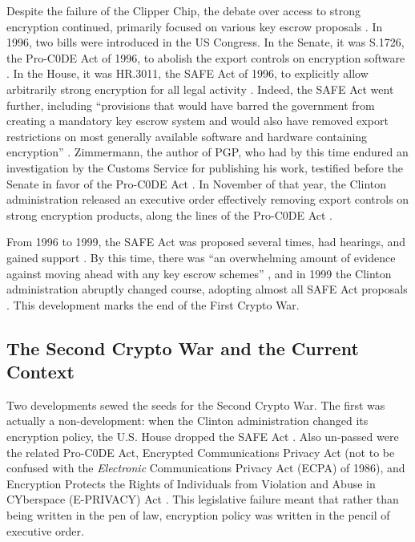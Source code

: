 Despite the failure of the Clipper Chip, the debate over access to strong encryption continued, primarily focused on
various key escrow proposals \cite{thompson_2015}. In 1996, two bills were introduced in the US Congress. In the Senate,
it was S.1726, the Pro-C0DE Act of 1996, to abolish the export controls on encryption software \cite{burns_s1726_1996}.
In the House, it was HR.3011, the SAFE Act of 1996, to explicitly allow arbitrarily strong encryption for all legal
activity \cite{goodlatte_hr3011_1996}. Indeed, the SAFE Act went further, including ``provisions that would have
barred the government from creating a mandatory key escrow system and would also have removed export restrictions on
most generally available software and hardware containing encryption'' \cite{kehl_right_2015}. Zimmermann, the author of
PGP, who had by this time endured an investigation by the Customs Service for publishing his work, testified before the
Senate in favor of the Pro-C0DE Act \cite{zimmermann_1996}. In November of that year, the Clinton administration
released an executive order effectively removing export controls on strong encryption products, along the lines of the
Pro-C0DE Act \cite{clinton_1996}.

From 1996 to 1999, the SAFE Act was proposed several times, had hearings, and gained support \cite{kehl_right_2015}. By
this time, there was ``an overwhelming amount of evidence against moving ahead with any key escrow schemes''
\cite{thompson_2015}, and in 1999 the Clinton administration abruptly changed course, adopting almost all SAFE Act
proposals \cite{kehl_right_2015}. This development marks the end of the First Crypto War.

\subsection{The Second Crypto War and the Current Context}

Two developments sewed the seeds for the Second Crypto War. The first was actually a non-development: when the Clinton
administration changed its encryption policy, the U.S. House dropped the SAFE Act \cite{kehl_right_2015}. Also un-passed
were the related Pro-C0DE Act, Encrypted Communications Privacy Act (not to be confused with the \textit{Electronic}
Communications Privacy Act (ECPA) of 1986), and Encryption Protects the Rights of Individuals from Violation and Abuse
in CYberspace (E-PRIVACY) Act \cite{leahy_s376_1997} \cite{ashcroft_s2067_1998}. This legislative failure meant that
rather than being written in the pen of law, encryption policy was written in the pencil of executive order.

